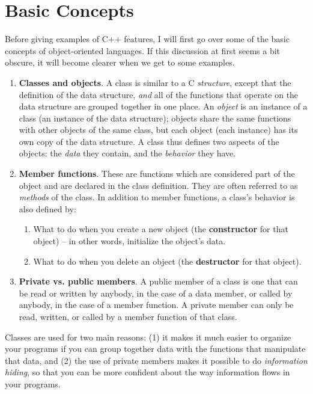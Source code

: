 \section{Basic Concepts}

Before giving examples of C++ features, I will first go over some of
the basic concepts of object-oriented languages.  If this discussion
at first seems a bit obscure, it will become clearer when we get
to some examples.

\begin{enumerate}

\item {\bf Classes and objects}.  A class is similar to a C {\em structure},
except that the definition of the data structure, {\em and} all of the 
functions that operate on the data structure are grouped together
in one place.  An {\em object} is an instance of a class (an instance
of the data structure); objects share the same functions with other objects
of the same class, but each object (each instance) has its own copy of 
the data structure.  A class thus defines two aspects of the objects: 
the {\em data} they contain, and the {\em behavior} they have.

\item {\bf Member functions}.  These are functions which are
considered part of the object and are declared in the class
definition.  They are often referred to as {\em methods} of the class.
In addition to member functions, a class's behavior is also defined
by:
\begin{enumerate}
\item What to do when you create a new object (the {\bf constructor}
for that object) -- in other words, initialize the object's data.
\item What to do when you delete an object (the {\bf destructor} for
that object).
\end{enumerate}

\item {\bf Private vs. public members}.  A public member of a class is
one that can be read or written by anybody, in the case of a data
member, or called by anybody, in the case of a member function.  A
private member can only be read, written, or called by a member
function of that class.
\end{enumerate}

Classes are used for two main reasons: (1) it makes it much easier to
organize your programs if you can group together data with the
functions that manipulate that data, and (2) the use of private
members makes it possible to do {\em information hiding}, so that you
can be more confident about the way information flows in your
programs.

